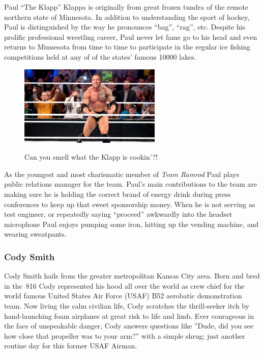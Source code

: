 \documentclass[conf]{new-aiaa}
\begin{document}
Paul ``The Klapp'' Klappa is originally from great frozen tundra of the remote northern state of Minnesota. In addition to understanding the sport of hockey, Paul is distinguished by the way he pronounces ``bag'', ``rag'', etc. Despite his prolific professional wrestling career, Paul never let fame go to his head and even returns to Minnesota from time to time to participate in the regular ice fishing competitions held at any of of the states' famous \num{10000} lakes.

\begin{figure}[hbt!]
	\centering
	\includegraphics[height=1.5in]{KlappIsCookin2.jpg}
	\label{PAVSLOGO}
	\caption{Can you smell what the Klapp is cookin'?!}
\end{figure}	

As the youngest and most charismatic member of \emph{Team Ramrod} Paul plays public relations manager for the team. Paul's main contributions to the team are making sure he is holding the correct brand of energy drink during press conferences to keep up that sweet sponsorship money. When he is not serving as test engineer, or repeatedly saying ``proceed'' awkwardly into the headset microphone Paul enjoys pumping some iron, hitting up the vending machine, and wearing sweatpants.

\subsubsection{Cody Smith}

Cody Smith hails from the greater metropolitan Kansas City area. Born and bred in the~\num{816} Cody represented his hood all over the world as crew chief for the world famous United States Air Force (USAF) B52 aerobatic demonstration team. Now living the calm civilian life, Cody scratches the thrill-seeker itch by hand-launching foam airplanes at great risk to life and limb. Ever courageous in the face of unspeakable danger, Cody answers questions like ''Dude, did you see how close that propeller was to your arm?'' with a simple shrug; just another routine day for this former USAF Airman.
\end{document}
